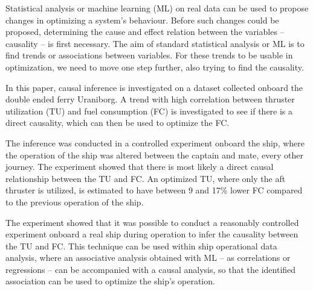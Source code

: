 Statistical analysis or machine learning (ML) on real data can be used to propose changes in optimizing a system's behaviour. Before such changes could be proposed, determining the cause and effect relation between the variables -- causality -- is first necessary.
The aim of standard statistical analysis or ML is to find trends or associations between variables. 
For these trends to be usable in optimization, we need to move one step further, also trying to find the causality.

In this paper, causal inference is investigated on a dataset collected onboard the double ended ferry Uraniborg.
A trend with high correlation between thruster utilization (TU) and fuel consumption (FC) is investigated to see if there is a direct causality, which can then be used to optimize the FC.

The inference was conducted in a controlled experiment onboard the ship, where the operation of the ship was altered between the captain and mate, every other journey.
The experiment showed that there is most likely a direct causal relationship between the TU and FC.
An optimized TU, where only the aft thruster is utilized, is estimated to have between 9 and 17\% lower FC compared to the previous operation of the ship.

The experiment showed that it was possible to conduct a reasonably controlled experiment onboard a real ship during operation to infer the causality between the TU and FC.
This technique can be used within ship operational data analysis, where an associative analysis obtained with ML -- as correlations or regressions --  can be accompanied with a causal analysis, so that the identified association can be used to optimize the ship's operation.






